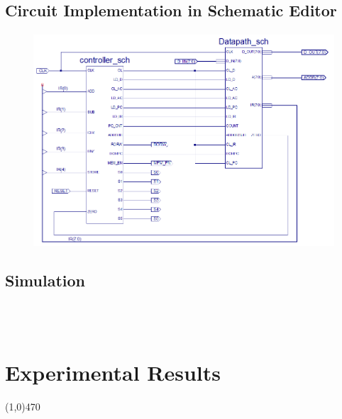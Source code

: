\documentclass[12pt]{article}
\begin{document}
		

	\subsection{Circuit Implementation in Schematic Editor}
		\paragraph*{}
			
		\begin{figure}[h]
			\includegraphics[scale=.6]{toy_sch.PNG}
			\caption{}
		\end{figure}
		
		\newpage
	\subsection{Simulation}
		

		
		\begin{Verbatim}[frame=single, fontsize= \small]

	
		\end{Verbatim}
		
			
\section{Experimental Results}\vspace{-.7cm} \line(1,0){470}

\begin{figure}[h]
    \centering
	\caption{}
\end{figure}

\begin{figure}[h]
    \centering
	\caption{}
\end{figure}
\end{document}
